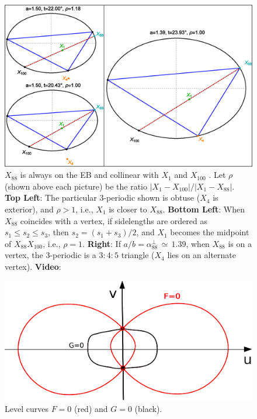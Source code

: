 \begin{figure}
    \centering
    \includegraphics[width=\textwidth]{pics/1130_x88_both.eps}
    \caption{$X_{88}$ is always on the EB and collinear with $X_1$ and $X_{100}$ \cite{etc}. Let $\rho$ (shown above each picture) be the ratio $|X_1-X_{100}|/|X_1-X_{88}|$. \textbf{Top Left}: The particular 3-periodic shown is obtuse ($X_4$ is exterior), and $\rho>1$, i.e., $X_1$ is closer to $X_{88}$. \textbf{Bottom Left}: When $X_{88}$ coincides with a vertex, if sidelengths are ordered as $s_1{\leq}s_2{\leq}s_3$, then $s_2=(s_1+s_3)/2$, and $X_1$ becomes the midpoint of $X_{88}X_{100}$, i.e., $\rho=1$. \textbf{Right}: If $a/b=\alpha_{88}^\perp\,{\simeq}\,1.39$, when $X_{88}$ is on a vertex, the 3-periodic is a $3:4:5$ triangle ($X_4$ lies on an alternate vertex). \textbf{Video}: \cite[PL\#11]{reznik2020-playlist-intriguing}}
    \label{fig:x88tri}
\end{figure}

\begin{figure}
    \centering
    \includegraphics[width=.66\textwidth]{pics/1140_x88x162_level_curves.eps}
    \caption{Level curves $F=0$ (red) and $G=0$ (black). }
    \label{fig:x88x162}
\end{figure}